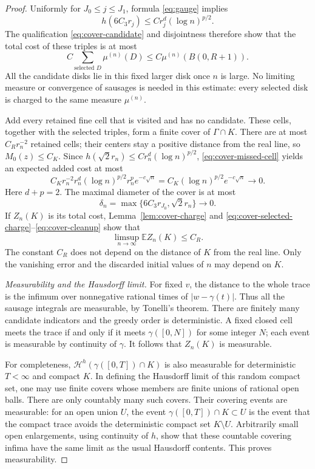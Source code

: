 \documentclass[11pt]{article}
\theoremstyle{definition}
\theoremstyle{remark}
\numberwithin{equation}{section}
\begin{document}
\begin{proof}
Uniformly for \(J_0\le j\le J_1\), formula
\eqref{eq:gauge} implies
\[
 h(6C_3r_j)\le C r_j^d(\log n)^{p/2}.
\]
The qualification \eqref{eq:cover-candidate} and disjointness
therefore show that the total cost of these triples is at most
\begin{equation}
 C\sum_{\text{selected }D}\mu^{(n)}(D)
       \le C\mu^{(n)}(B(0,R+1)).
 \label{eq:cover-selected-charge}
\end{equation}
All the candidate disks lie in this fixed larger disk once
\(n\) is large.  No limiting measure or convergence of sausages
is needed in this estimate: every selected disk is charged to
the same measure \(\mu^{(n)}\).

Add every retained fine cell that is visited and has no candidate.
These cells, together with the selected triples, form a finite
cover of \(\Gamma\cap K\).  There are at most \(C_Rr_n^{-2}\)
retained cells; their centers stay a positive distance from the
real line, so \(M_0(z)\le C_K\).  Since
\(h(\sqrt2r_n)\le Cr_n^d(\log n)^{p/2}\),
\eqref{eq:cover-missed-cell} yields an expected added cost at most
\begin{equation}
 C_Kr_n^{-2}r_n^d(\log n)^{p/2}r_n^p e^{-c\sqrt n}
   =C_K(\log n)^{p/2}e^{-c\sqrt n}\longrightarrow0.
 \label{eq:cover-cleanup}
\end{equation}
Here \(d+p=2\).  The maximal diameter of the cover is at most
\[
 \delta_n=\max\{6C_3r_{J_0},\sqrt2r_n\}\longrightarrow0.
\]
If \(Z_n(K)\) is its total cost, Lemma~\ref{lem:cover-charge}
and \eqref{eq:cover-selected-charge}--\eqref{eq:cover-cleanup}
show that
\begin{equation}
 \limsup_{n\to\infty}\mathbb E Z_n(K)\le C_R.
 \label{eq:cover-cost-expectation}
\end{equation}
The constant \(C_R\) does not depend on the distance of \(K\)
from the real line.  Only the vanishing error and the discarded
initial values of \(n\) may depend on \(K\).

\emph{Measurability and the Hausdorff limit.}
For fixed \(v\), the distance to the whole trace is the infimum
over nonnegative rational times of \(|w-\gamma(t)|\).  Thus all
the sausage integrals are measurable, by Tonelli's theorem.
There are finitely many candidate indicators and the greedy
order is deterministic.  A fixed closed cell meets the trace
if and only if it meets \(\gamma([0,N])\) for some integer
\(N\); each event is measurable by continuity of \(\gamma\).
It follows that \(Z_n(K)\) is measurable.

For completeness, \(\mathcal H^h(\gamma([0,T])\cap K)\) is
also measurable for deterministic \(T<\infty\) and compact
\(K\).  In defining the Hausdorff limit of this random compact
set, one may use finite covers whose members are finite unions
of rational open balls.  There are only countably many such
covers.  Their covering events are measurable: for an open
union \(U\), the event
\(\gamma([0,T])\cap K\subset U\) is the event that the compact
trace avoids the deterministic compact set \(K\setminus U\).
Arbitrarily small open enlargements, using continuity of \(h\),
show that these countable covering infima have the same limit
as the usual Hausdorff contents.  This proves measurability.


\end{proof}
\end{document}
